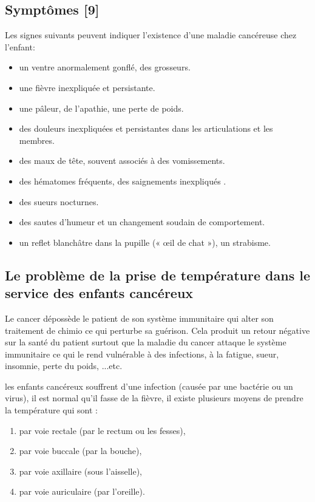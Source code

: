 \documentclass[12pt]{article}
\begin{document}
\newpage

\subsection{Symptômes [9]}
Les signes suivants peuvent indiquer l’existence d’une maladie cancéreuse chez l’enfant:
\begin{itemize}
	\item un ventre anormalement gonflé, des grosseurs.  
	\item une fièvre inexpliquée et persistante. 
	\item une pâleur, de l’apathie, une perte de poids. 
	\item des douleurs inexpliquées et persistantes dans les articulations et les membres.
	\item des maux de tête, souvent associés à des vomissements. 
	\item des hématomes fréquents, des saignements inexpliqués . 
	\item des sueurs nocturnes. 
	\item des sautes d’humeur et un changement soudain de comportement. 
	\item un reflet blanchâtre dans la pupille (« œil de chat »), un strabisme.
\end{itemize}

\subsection{Le problème de la prise de température dans le service des enfants cancéreux}
Le cancer dépossède le patient de son système immunitaire qui alter son traitement de chimio ce qui perturbe sa guérison. Cela produit un retour négative sur la santé du patient surtout que la maladie du cancer attaque le système immunitaire ce qui le rend vulnérable à des infections, à la fatigue, sueur, insomnie, perte du poids, ...etc.

les enfants cancéreux souffrent d’une infection (causée par une bactérie ou un virus), il est normal qu’il fasse de la fièvre, il existe plusieurs moyens de prendre la température qui sont :
\begin{enumerate}
	\item par voie rectale (par le rectum ou les fesses),
	\item par voie buccale (par la bouche),
	\item par voie axillaire (sous l’aisselle),
	\item par voie auriculaire (par l’oreille).
\end{enumerate}
\end{document}
